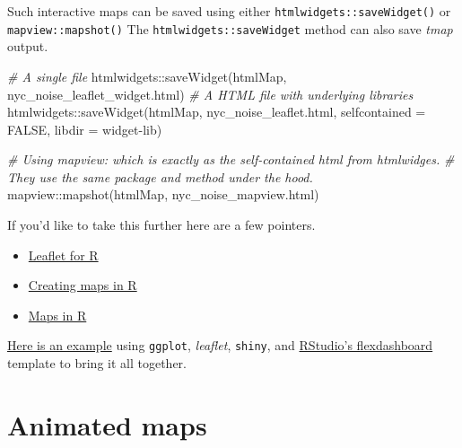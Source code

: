 \documentclass[
  11pt,
]{book}
\newenvironment{Shaded}{\begin{snugshade}}{\end{snugshade}}
\newcommand{\AttributeTok}[1]{\textcolor[rgb]{0.77,0.63,0.00}{#1}}
\newcommand{\CommentTok}[1]{\textcolor[rgb]{0.56,0.35,0.01}{\textit{#1}}}
\newcommand{\ConstantTok}[1]{\textcolor[rgb]{0.00,0.00,0.00}{#1}}
\newcommand{\FunctionTok}[1]{\textcolor[rgb]{0.00,0.00,0.00}{#1}}
\newcommand{\NormalTok}[1]{#1}
\newcommand{\SpecialCharTok}[1]{\textcolor[rgb]{0.00,0.00,0.00}{#1}}
\newcommand{\StringTok}[1]{\textcolor[rgb]{0.31,0.60,0.02}{#1}}
\providecommand{\tightlist}{%
  \setlength{\itemsep}{0pt}\setlength{\parskip}{0pt}}
\begin{document}
Such interactive maps can be saved using either \texttt{htmlwidgets::saveWidget()} or \texttt{mapview::mapshot()} The \texttt{htmlwidgets::saveWidget} method can also save \emph{tmap} output.

\begin{Shaded}
\begin{Highlighting}[]
\CommentTok{\# A single file}
\NormalTok{htmlwidgets}\SpecialCharTok{::}\FunctionTok{saveWidget}\NormalTok{(htmlMap, }\StringTok{\textquotesingle{}nyc\_noise\_leaflet\_widget.html\textquotesingle{}}\NormalTok{)}
\CommentTok{\# A HTML file with underlying libraries}
\NormalTok{htmlwidgets}\SpecialCharTok{::}\FunctionTok{saveWidget}\NormalTok{(htmlMap, }\StringTok{\textquotesingle{}nyc\_noise\_leaflet.html\textquotesingle{}}\NormalTok{, }
                        \AttributeTok{selfcontained =} \ConstantTok{FALSE}\NormalTok{, }\AttributeTok{libdir =} \StringTok{\textquotesingle{}widget{-}lib\textquotesingle{}}\NormalTok{)}

\CommentTok{\# Using mapview: which is exactly as the self{-}contained html from htmlwidges.}
\CommentTok{\# They use the same package and method under the hood.}
\NormalTok{mapview}\SpecialCharTok{::}\FunctionTok{mapshot}\NormalTok{(htmlMap, }\StringTok{\textquotesingle{}nyc\_noise\_mapview.html\textquotesingle{}}\NormalTok{)}
\end{Highlighting}
\end{Shaded}

If you'd like to take this further here are a few pointers.

\begin{itemize}
\tightlist
\item
  \href{http://rstudio.github.io/leaflet/}{Leaflet for R}
\item
  \href{https://github.com/Robinlovelace/Creating-maps-in-R/blob/master/vignettes/vspd-base-shiny.Rmd}{Creating maps in R}
\item
  \href{https://cyberhelp.sesync.org/maps-in-R-lesson/}{Maps in R}
\end{itemize}

\href{https://cengel.shinyapps.io/RioSlaveMarket/}{Here is an example} using \texttt{ggplot}, \emph{leaflet}, \texttt{shiny}, and \href{http://rmarkdown.rstudio.com/flexdashboard/}{RStudio's flexdashboard} template to bring it all together.

\hypertarget{animated-maps}{%
\section{Animated maps}\label{animated-maps}}
\end{document}
